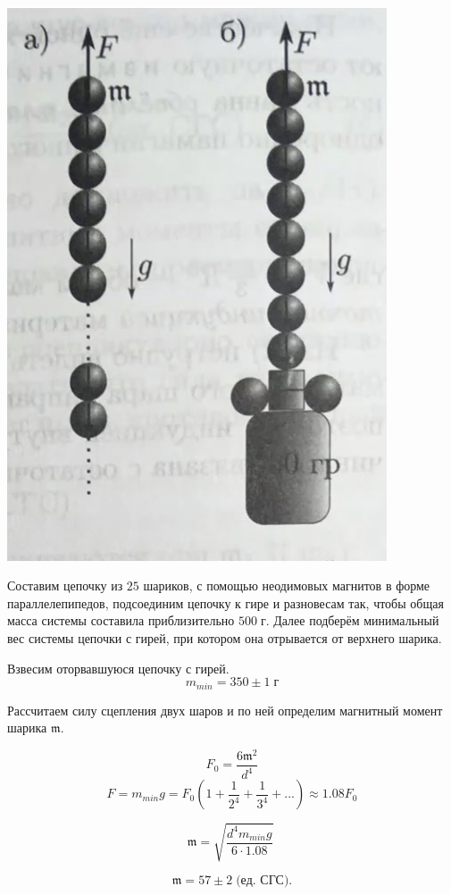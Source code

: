 \documentclass[a4paper,12pt]{article}
\begin{document}
\begin{center}
\begin{minipage}{0.4\textwidth}
\end{minipage}
\begin{minipage}{0.05\textwidth}
\
\end{minipage}
\begin{minipage}{0.4\textwidth}
\begin{center}
\includegraphics[width=0.7\linewidth]{2.jpg}\\
\end{center}
Составим цепочку из $25$ шариков, с помощью неодимовых магнитов в форме параллелепипедов, подсоединим цепочку к гире и разновесам так, чтобы общая масса системы составила приблизительно $500 \;\text{г}$. Далее подберём минимальный вес системы цепочки с гирей, при котором она отрывается от верхнего шарика.

Взвесим оторвавшуюся цепочку с гирей. $$m_{min} = 350 \pm 1 \; \text{г}$$

Рассчитаем силу сцепления двух шаров и по ней определим магнитный момент шарика $\mathfrak{m}$.

\[ F_0 = \frac{6\mathfrak{m}^2}{d^4} \] \[F = m_{min}g  = F_0(1+\frac1{2^4}+\frac1{3^4} +...)\approx 1.08 F_0 \]

\[ \mathfrak{m} = \sqrt{\frac{d^4m_{min}g}{6 \cdot 1.08}} \;\]

\[\mathfrak{m} = 57 \pm 2 \; \text{(ед. СГС)}.\]
\end{minipage}
\end{center}
\end{document}

